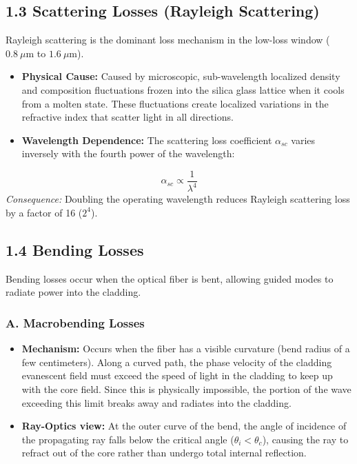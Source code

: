 \subsection{1.3 Scattering Losses (Rayleigh Scattering)}
Rayleigh scattering is the dominant loss mechanism in the low-loss window ($0.8\ \mu\text{m}$ to $1.6\ \mu\text{m}$).
\begin{itemize}
  \item   \textbf{Physical Cause:} Caused by microscopic, sub-wavelength localized density and composition fluctuations frozen into the silica glass lattice when it cools from a molten state. These fluctuations create localized variations in the refractive index that scatter light in all directions.
  \item   \textbf{Wavelength Dependence:} The scattering loss coefficient $\alpha_{sc}$ varies inversely with the fourth power of the wavelength:
\end{itemize}
    \[ \alpha_{sc} \propto \frac{1}{\lambda^4} \]
    \textit{Consequence:} Doubling the operating wavelength reduces Rayleigh scattering loss by a factor of 16 ($2^4$).

\subsection{1.4 Bending Losses}
Bending losses occur when the optical fiber is bent, allowing guided modes to radiate power into the cladding.

\subsubsection{A. Macrobending Losses}
\begin{itemize}
  \item   \textbf{Mechanism:} Occurs when the fiber has a visible curvature (bend radius of a few centimeters). Along a curved path, the phase velocity of the cladding evanescent field must exceed the speed of light in the cladding to keep up with the core field. Since this is physically impossible, the portion of the wave exceeding this limit breaks away and radiates into the cladding.
  \item   \textbf{Ray-Optics view:} At the outer curve of the bend, the angle of incidence of the propagating ray falls below the critical angle ($\theta_i < \theta_c$), causing the ray to refract out of the core rather than undergo total internal reflection.
\end{itemize}

